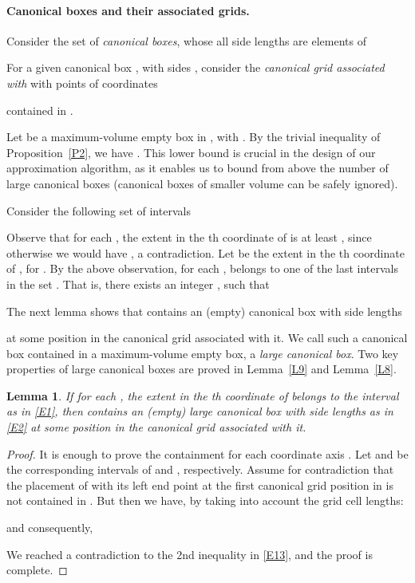\documentclass[11pt]{article}
\newtheorem{lemma}{Lemma}
\begin{document}
\paragraph{Canonical boxes and their associated grids.}
Consider the set  of {\em canonical boxes}, whose 
all side lengths are elements of
 
For a given canonical box , with sides 
,
consider the {\em canonical grid associated with } 
with points of coordinates 

 
contained in . 

Let  be a maximum-volume empty box in , with
. By the trivial inequality  of Proposition~\ref{P2}, we have
. This lower bound is crucial
in the design of our approximation algorithm, as it enables us to
bound from above the number of large canonical boxes (canonical boxes
of smaller volume can be safely ignored).  

Consider the following set  of  intervals 
 
Observe that for each , the extent in the th
coordinate of  is at least ,
since otherwise we would have 
, a contradiction.
Let  be the extent in the th coordinate of , for
. By the above observation, for each ,
 belongs to one of the last  intervals in the set . That
is, there exists an integer , such that 
 

The next lemma shows that  contains an (empty) canonical box
with side lengths 
 
at some position in the canonical grid associated with it. 
We call such a canonical box contained in a maximum-volume empty box,
a  {\em large canonical box}. Two key properties of large
canonical boxes are proved in Lemma~\ref{L9} and Lemma~\ref{L8}. 


\begin{lemma} \label{L7}
If for each , 
the extent in the th coordinate of  belongs to the interval
as in \eqref{E1}, then  contains an (empty) large canonical box
 with side lengths as in \eqref{E2} at some position in the
canonical grid associated with it.    
\end{lemma}
\begin{proof}
It is enough to prove the containment for each coordinate axis . 
Let  and  be the corresponding intervals of 
and , respectively.
Assume for contradiction that the placement of  with its left end
point at the first canonical grid position in  is not contained in 
. But then we have, by taking into account the grid cell lengths:

and consequently,

We reached a contradiction to the 2nd inequality in \eqref{E13}, and
the proof is complete. 
\end{proof}
\end{document}
